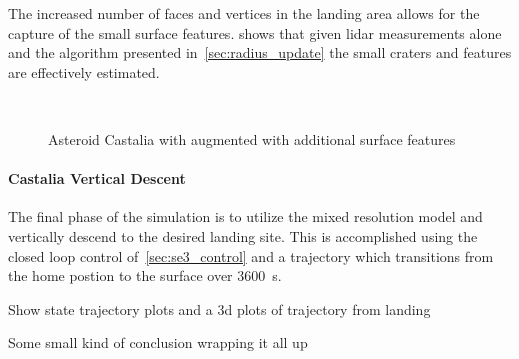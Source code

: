 The increased number of faces and vertices in the landing area allows for the capture of the small surface features.
 shows that given \gls{lidar} measurements alone and the algorithm presented in~\cref{sec:radius_update} the small craters and features are effectively estimated.
\begin{figure}[htbp]
    \centering
    ~
    \caption{Asteroid Castalia with augmented with additional surface features~\label{fig:castalia_refinement}}
\end{figure}

\paragraph{Castalia Vertical Descent}
The final phase of the simulation is to utilize the mixed resolution model and vertically descend to the desired landing site. 
This is accomplished using the closed loop control of~\cref{sec:se3_control} and a trajectory which transitions from the home postion to the surface over \SI{3600}{\second}.

Show state trajectory plots and a 3d plots of trajectory from landing

Some small kind of conclusion wrapping it all up
